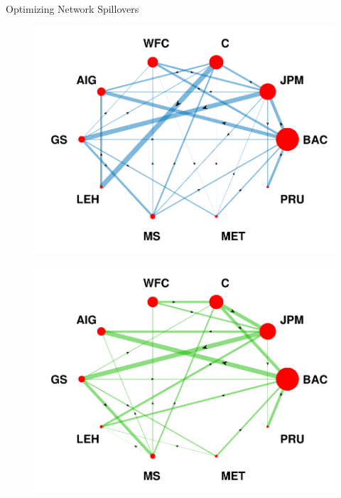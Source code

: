 \documentclass[12pt,envcountsect, leqno,xcolor=dvipsnames]{beamer}
\begin{document}
\begin{frame}{Optimizing Network Spillovers}

\begin{figure}
\centering
\begin{minipage}{.5\textwidth}
  \centering
  \includegraphics[width=\linewidth]{./worst_10nodes}
  \label{fig:test1}
\end{minipage}%
\begin{minipage}{.5\textwidth}
  \centering
  \includegraphics[width=\linewidth]{./best_10nodes}
  \label{fig:test2}
\end{minipage}
\end{figure}

\end{frame}
\end{document}
